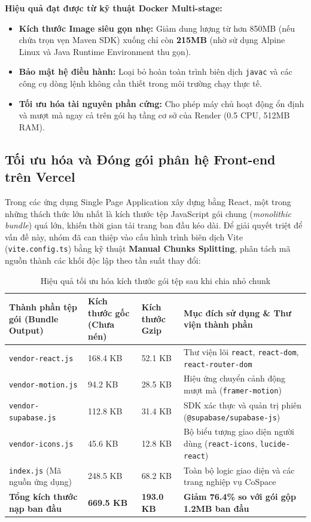 \noindent\textbf{Hiệu quả đạt được từ kỹ thuật Docker Multi-stage:}
\begin{itemize}
    \item \textbf{Kích thước Image siêu gọn nhẹ:} Giảm dung lượng từ hơn 850MB (nếu chứa trọn vẹn Maven SDK) xuống chỉ còn \textbf{215MB} (nhờ sử dụng Alpine Linux và Java Runtime Environment thu gọn).
    \item \textbf{Bảo mật hệ điều hành:} Loại bỏ hoàn toàn trình biên dịch \texttt{javac} và các công cụ dòng lệnh không cần thiết trong môi trường chạy thực tế.
    \item \textbf{Tối ưu hóa tài nguyên phần cứng:} Cho phép máy chủ hoạt động ổn định và mượt mà ngay cả trên gói hạ tầng cơ sở của Render (0.5 CPU, 512MB RAM).
\end{itemize}

\subsection{Tối ưu hóa và Đóng gói phân hệ Front-end trên Vercel}

Trong các ứng dụng Single Page Application xây dựng bằng React, một trong những thách thức lớn nhất là kích thước tệp JavaScript gói chung (\textit{monolithic bundle}) quá lớn, khiến thời gian tải trang ban đầu kéo dài. Để giải quyết triệt để vấn đề này, nhóm đã can thiệp vào cấu hình trình biên dịch Vite (\texttt{vite.config.ts}) bằng kỹ thuật \textbf{Manual Chunks Splitting}, phân tách mã nguồn thành các khối độc lập theo tần suất thay đổi:

\begin{table}[H]
\centering
\caption{Hiệu quả tối ưu hóa kích thước gói tệp sau khi chia nhỏ chunk}
\label{tab:bundle-optimization}
\renewcommand{\arraystretch}{1.3}
\begin{tabular}{|p{4.2cm}|p{3.2cm}|p{3.2cm}|p{4.2cm}|}
\hline
\textbf{Thành phần tệp gói (Bundle Output)} & \textbf{Kích thước gốc (Chưa nén)} & \textbf{Kích thước Gzip} & \textbf{Mục đích sử dụng \& Thư viện thành phần} \\
\hline
\texttt{vendor-react.js} & 168.4 KB & 52.1 KB & Thư viện lõi \texttt{react}, \texttt{react-dom}, \texttt{react-router-dom} \\
\hline
\texttt{vendor-motion.js} & 94.2 KB & 28.5 KB & Hiệu ứng chuyển cảnh động mượt mà (\texttt{framer-motion}) \\
\hline
\texttt{vendor-supabase.js} & 112.8 KB & 31.4 KB & SDK xác thực và quản trị phiên (\texttt{@supabase/supabase-js}) \\
\hline
\texttt{vendor-icons.js} & 45.6 KB & 12.8 KB & Bộ biểu tượng giao diện người dùng (\texttt{react-icons}, \texttt{lucide-react}) \\
\hline
\texttt{index.js} (Mã nguồn ứng dụng) & 248.5 KB & 68.2 KB & Toàn bộ logic giao diện và các trang nghiệp vụ CoSpace \\
\hline
\textbf{Tổng kích thước nạp ban đầu} & \textbf{669.5 KB} & \textbf{193.0 KB} & \textbf{Giảm 76.4\% so với gói gộp 1.2MB ban đầu} \\
\hline
\end{tabular}
\end{table}

